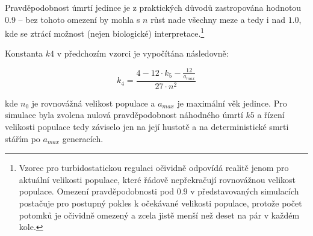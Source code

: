Pravděpodobnost úmrtí jedince je z praktických důvodů zastropována hodnotou 0.9 --
bez tohoto omezení by mohla s $n$ růst nade všechny meze a tedy i nad $1.0$,
kde se ztrácí možnost (nejen biologické) interpretace.\footnote{
Vzorec pro turbidostatickou regulaci očividně odpovídá realitě jenom pro aktuální velikosti populace,
které řádově nepřekračují rovnovážnou velikost populace. Omezení pravděpodobnosti pod $0.9$ v představovaných
simulacích postačuje pro postupný pokles k očekávané velikosti populace, protože počet potomků je očividně omezený a
zcela jistě menší než deset na pár v každém kole.
}

Konstanta $k4$ v předchozím vzorci je vypočítána následovně:

\begin{equation}
k_4 = \frac{4 - 12\cdot{}{k_5} - \frac{12}{a_{max}}}
           {27\cdot{}n^2}
\end{equation}


kde $n_0$ je rovnovážná velikost populace a $a_{max}$ je maximální věk jedince.
Pro simulace byla zvolena nulová pravděpodobnost náhodného úmrtí $k5$ a řízení velikosti populace tedy záviselo jen na
její hustotě a na deterministické smrti stářím po $a_{max}$ generacích.

